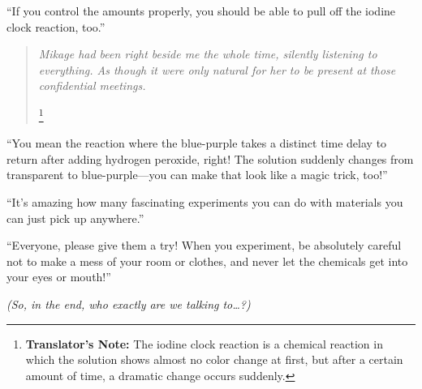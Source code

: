 \documentclass[
    a4paper,
    12pt,
    twoside,
    openany,
    UTF8,
    fontset=windows
]{ctexbook}
\begin{document}
``If you control the amounts properly, you should be able to pull off the iodine clock reaction, too.''

\begin{quote}
\textit{Mikage had been right beside me the whole time, silently listening to everything. As though it were only natural for her to be present at those confidential meetings.}

\footnote{\textbf{Translator's Note:} The iodine clock reaction is a chemical reaction in which the solution shows almost no color change at first, but after a certain amount of time, a dramatic change occurs suddenly.}
\end{quote}

``You mean the reaction where the blue-purple takes a distinct time delay to return after adding hydrogen peroxide, right! The solution suddenly changes from transparent to blue-purple---you can make that look like a magic trick, too!''

``It's amazing how many fascinating experiments you can do with materials you can just pick up anywhere.''

``Everyone, please give them a try! When you experiment, be absolutely careful not to make a mess of your room or clothes, and never let the chemicals get into your eyes or mouth!''

\textit{(So, in the end, who exactly are we talking to\dots?)}
\end{document}
